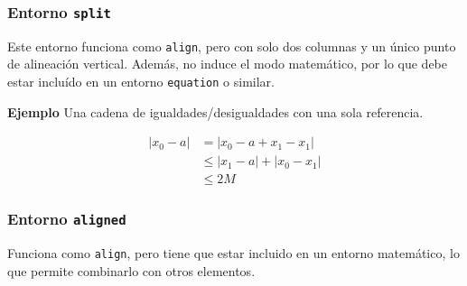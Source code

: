 \documentclass[11pt,a4paper]{report}
\begin{document}
\bigskip





\subsubsection{Entorno \texttt{split}}





Este entorno funciona como \texttt{align}, pero con solo dos columnas y un único punto de alineación vertical. Además, no induce el modo matemático, por lo que debe estar incluído en un entorno \texttt{equation} o similar. 





\bigskip
\textbf{Ejemplo} Una cadena de igualdades/desigualdades con una sola referencia.

\begin{equation}
\begin{split}
|x_0-a|& = |x_0-a+x_1-x_1|\\
        & \leq |x_1-a|+|x_0-x_1|\\
        & \leq 2M
\end{split}
\end{equation}

\bigskip





\subsubsection{Entorno \texttt{aligned}}



Funciona como \texttt{align}, pero tiene que estar incluido en un entorno matemático, lo que permite combinarlo con otros elementos.
\end{document}
